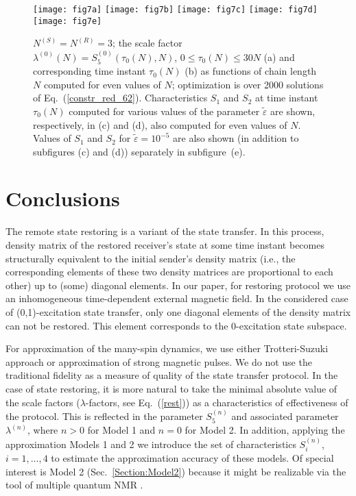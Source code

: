 \documentclass[pra,preprint,showpacs]{revtex4-1}
\begin{document}
{{\begin{figure*}[!]
\centering
\texttt{[image: fig7a]}
  \texttt{[image: fig7b]}
  \texttt{[image: fig7c]}
  \texttt{[image: fig7d]}
  \texttt{[image: fig7e]}
\caption{$N^{(S)}=N^{(R)}=3$; the scale factor $\lambda^{(0)}(N)=S_5^{(0)}(\tau_0(N),N)$, {$0\le \tau_0(N) \le 30 N$} (a) and corresponding  time instant $\tau_0(N)$ (b) as  functions of chain length $N$ computed for even values of $N$; optimization is over 2000 solutions of Eq.~(\ref{constr_red_62}).
{Characteristics $S_1$ and $S_2$ at time instant $\tau_0(N)$ computed for various  values of the parameter $\tilde\varepsilon$ are shown, respectively, in (c) and (d), also computed for even values of $N$. Values of $S_1$ and $S_2$ for $\tilde\varepsilon=10^{-5}$ are also shown (in addition to subfigures (c) and (d)) separately in subfigure~(e).}}
\label{Fig:CT2}
\end{figure*}


\section{Conclusions}
\label{Section:conclusions}
The remote state restoring is a variant of the state transfer. In this process, density matrix of the restored  receiver's state  at some time instant becomes structurally equivalent to the initial sender's density matrix (i.e., the corresponding  elements of these  two density matrices  are proportional to each other) up to (some) diagonal elements. In our paper, for restoring protocol we use an inhomogeneous time-dependent external magnetic field. In the considered case of (0,1)-excitation state transfer, only one diagonal elements of the density matrix can not be restored. This element corresponds to the 0-excitation state subspace.

For approximation of the many-spin dynamics, we use either Trotteri-Suzuki approach or approximation of strong magnetic pulses. We do not use the traditional fidelity as a measure of quality of the state transfer protocol. In the case of state restoring, it is more natural to take the minimal  absolute value of the scale factors ($\lambda$-factors, see Eq.~(\ref{rest}))  as  a characteristics of effectiveness of the protocol. This is reflected in the parameter $S_5^{(n)}$ and associated parameter $\lambda^{(n)}$, where $n>0$ for Model 1 and $n=0$ for Model 2. In addition, applying the approximation Models 1 and 2 we introduce the set of characteristics $S^{(n)}_i$, $i=1,\dots,4$ to estimate the approximation accuracy of these models. Of special interest is Model 2 (Sec.~\ref{Section:Model2}) because it might be realizable via the tool of multiple quantum NMR \cite{Baum}.


}}
\end{document}
